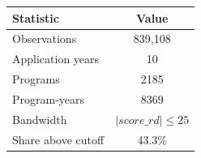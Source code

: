 \begin{tabular}{lc}
\toprule
Statistic & Value \\
\midrule
Observations &      839,108 \\
Application years & 10 \\
Programs & 2185 \\
Program-years & 8369 \\
Bandwidth & $|score\_rd| \leq 25$ \\
Share above cutoff & 43.3\% \\
\bottomrule
\end{tabular}
